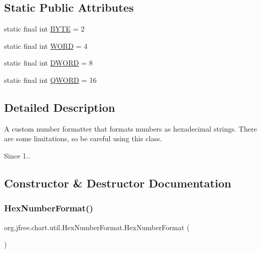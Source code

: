 \subsection*{Static Public Attributes}
\begin{DoxyCompactItemize}
\item 
static final int \mbox{\hyperlink{classorg_1_1jfree_1_1chart_1_1util_1_1_hex_number_format_a040e486fc5bdfa36c78dd721cc8d946e}{B\+Y\+TE}} = 2
\item 
static final int \mbox{\hyperlink{classorg_1_1jfree_1_1chart_1_1util_1_1_hex_number_format_a5fa5d3f24fe7f0a7aa1ef6e500d48551}{W\+O\+RD}} = 4
\item 
static final int \mbox{\hyperlink{classorg_1_1jfree_1_1chart_1_1util_1_1_hex_number_format_a0066bb539bff20dfc58a026e01b9d834}{D\+W\+O\+RD}} = 8
\item 
static final int \mbox{\hyperlink{classorg_1_1jfree_1_1chart_1_1util_1_1_hex_number_format_a449224a5d7a7786945e434459d555a44}{Q\+W\+O\+RD}} = 16
\end{DoxyCompactItemize}


\subsection{Detailed Description}
A custom number formatter that formats numbers as hexadecimal strings. There are some limitations, so be careful using this class.

\begin{DoxySince}{Since}
1.. 
\end{DoxySince}


\subsection{Constructor \& Destructor Documentation}
\mbox{\label{classorg_1_1jfree_1_1chart_1_1util_1_1_hex_number_format_af4d5f14b2f65e1904803eef43a7e0ba0}} 
\subsubsection{\texorpdfstring{Hex\+Number\+Format()}{HexNumberFormat()}\hspace{0.1cm}{\footnotesize\ttfamily [1/2]}}
{\footnotesize\ttfamily org.\+jfree.\+chart.\+util.\+Hex\+Number\+Format.\+Hex\+Number\+Format (\begin{DoxyParamCaption}{ }\end{DoxyParamCaption})}


